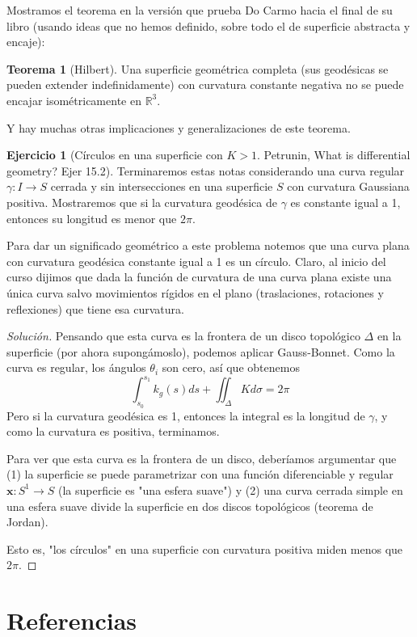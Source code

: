\documentclass[spanish]{book}
\theoremstyle{definition}
\newtheorem*{teo}{Teorema}
\newtheorem*{ejer}{Ejercicio}
\newcommand{\R}{\mathbb{R}}
\begin{document}
Mostramos el teorema en la versión que prueba Do Carmo hacia el final de su libro (usando ideas que no hemos definido, sobre todo el de superficie abstracta y encaje):
\begin{teo}[Hilbert]
	Una superficie geométrica completa (sus geodésicas se pueden extender indefinidamente) con curvatura constante negativa no se puede encajar isométricamente en $\R^3$.
\end{teo}
Y hay muchas otras implicaciones y generalizaciones de este teorema.
\begin{ejer}[Círculos en una superficie con $K>1$. Petrunin, What is differential geometry? Ejer 15.2]
	Terminaremos estas notas considerando una curva regular $\gamma:I\to S$ cerrada y sin intersecciones en una superficie $S$ con curvatura Gaussiana positiva. Mostraremos que si la curvatura geodésica de $\gamma$ es constante igual a 1, entonces su longitud es menor que $2\pi$.
	
	Para dar un significado geométrico a este problema notemos que una curva plana con curvatura geodésica constante igual a 1 es un círculo. Claro, al inicio del curso dijimos que dada la función de curvatura de una curva plana existe una única curva salvo movimientos rígidos en el plano (traslaciones, rotaciones y reflexiones) que tiene esa curvatura.
\end{ejer}
\begin{proof}[Solución]
	Pensando que esta curva es la frontera de un disco topológico $\Delta$ en la superficie (por ahora supongámoslo), podemos aplicar Gauss-Bonnet. Como la curva es regular, los ángulos $\theta_i$ son cero, así que obtenemos
	\[\int_{s_0}^{s_1} k_g(s)ds+\iint_\Delta Kd\sigma=2\pi\]
	Pero si la curvatura geodésica es 1, entonces la integral es la longitud de $\gamma$, y como la curvatura es positiva, terminamos.
	
	Para ver que esta curva es la frontera de un disco, deberíamos argumentar que (1) la superficie se puede parametrizar con una función diferenciable y regular $\mathbf x:S^1\to S$ (la superficie es "una esfera suave") y (2) una curva cerrada simple en una esfera suave divide la superficie en dos discos topológicos (teorema de Jordan).
	
	Esto es, "los círculos" en una superficie con curvatura positiva miden menos que $2\pi$.
\end{proof}
\chapter{Referencias}
\end{document}
